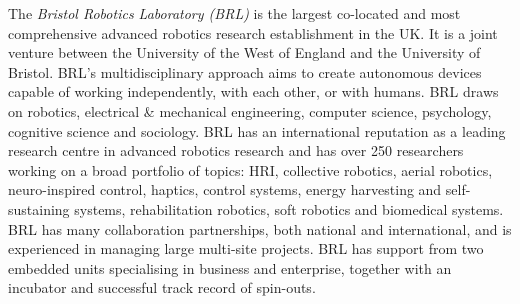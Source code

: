 \documentclass[11pt,a4paper]{report}
\begin{document}
The \emph{Bristol Robotics Laboratory (BRL)} is the largest co-located
and most comprehensive advanced robotics research establishment in the
UK. It is a joint venture between the University of the West of England
and the University of Bristol. BRL's multidisciplinary approach aims to
create autonomous devices capable of working independently, with each
other, or with humans. BRL draws on robotics, electrical \& mechanical
engineering, computer science, psychology, cognitive science and
sociology. BRL has an international reputation as a leading research
centre in advanced robotics research and has over 250 researchers
working on a broad portfolio of topics: HRI, collective robotics, aerial
robotics, neuro-inspired control, haptics, control systems, energy
harvesting and self-sustaining systems, rehabilitation robotics, soft
robotics and biomedical systems. BRL has many collaboration
partnerships, both national and international, and is experienced in
managing large multi-site projects. BRL has support from two embedded
units specialising in business and enterprise, together with an
incubator and successful track record of spin-outs.

\newpage

\printbibliography
\end{document}
